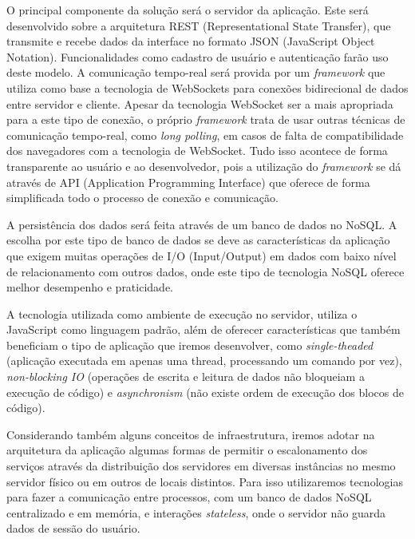 O principal componente da solução será o servidor da aplicação. Este será desenvolvido sobre a arquitetura REST (Representational State Transfer), que transmite e recebe dados da interface no formato JSON (JavaScript Object Notation). Funcionalidades como cadastro de usuário e autenticação farão uso deste modelo. A comunicação tempo-real será provida por um \textit{framework} que utiliza como base a tecnologia de WebSockets para conexões bidirecional de dados entre servidor e cliente. Apesar da tecnologia WebSocket ser a mais apropriada para a este tipo de conexão, o próprio \textit{framework} trata de usar outras técnicas de comunicação tempo-real, como \textit{long polling}, em casos de falta de compatibilidade dos navegadores com a tecnologia de WebSocket. Tudo isso acontece de forma transparente ao usuário e ao desenvolvedor, pois a utilização do \textit{framework} se dá através de API (Application Programming Interface) que oferece de forma simplificada todo o processo de conexão e comunicação.

A persistência dos dados será feita através de um banco de dados no NoSQL. A escolha por este tipo de banco de dados se deve as características da aplicação que exigem muitas operações de I/O (Input/Output) em dados com baixo nível de relacionamento com outros dados, onde este tipo de tecnologia NoSQL oferece melhor desempenho e praticidade.

A tecnologia utilizada como ambiente de execução no servidor, utiliza o JavaScript como linguagem padrão, além de oferecer características que também beneficiam o tipo de aplicação que iremos desenvolver, como \textit{single-theaded} (aplicação executada em apenas uma thread, processando um comando por vez), \textit{non-blocking IO} (operações de escrita e leitura de dados não bloqueiam a execução de código) e \textit{asynchronism} (não existe ordem de execução dos blocos de código). 

Considerando também alguns conceitos de infraestrutura, iremos adotar na arquitetura da aplicação algumas formas de permitir o escalonamento dos serviços através da distribuição dos servidores em diversas instâncias no mesmo servidor físico ou em outros de locais distintos. Para isso utilizaremos tecnologias para fazer a comunicação entre processos, com um banco de dados NoSQL centralizado e em memória, e interações \textit{stateless}, onde o servidor não guarda dados de sessão do usuário.